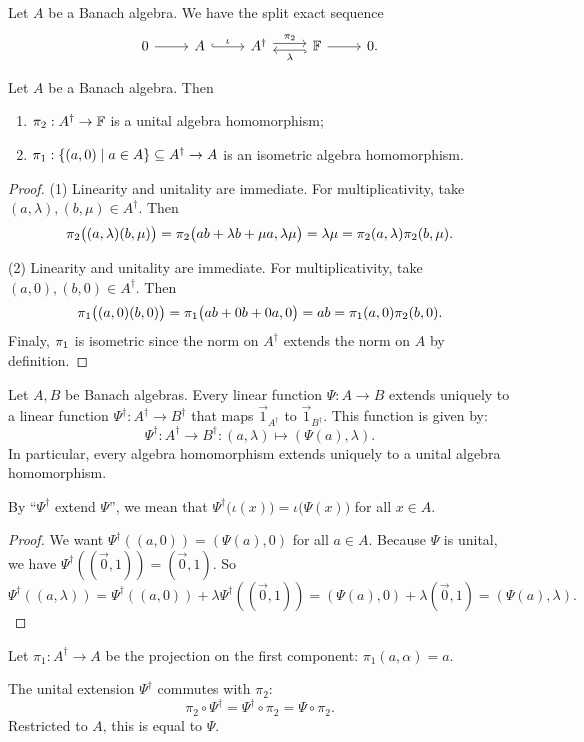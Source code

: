 \begin{lemma}
Let $A$ be a Banach algebra. We have the split exact sequence
\[ \begin{tikzcd}
0 \rar & A \rar[hook, "\iota"] & A^\dagger \rar[shift left, "\pi_2"] & \lar[hook, shift left, "\lambda"] \F \rar & 0.
\end{tikzcd} \]
\end{lemma}

\begin{lemma} \label{unitalProjectionsAlgebraHomomorphisms}
Let $A$ be a Banach algebra. Then
\begin{enumerate}
\item $\pi_2: A^\dagger \to \mathbb{F}$ is a unital algebra homomorphism;
\item $\proj_1: \setbuilder{(a,0)}{a\in A}\subseteq A^\dagger \to A$ is an isometric algebra homomorphism.
\end{enumerate}
\end{lemma}
\begin{proof}
(1) Linearity and unitality are immediate. For multiplicativity, take $(a,\lambda), (b, \mu)\in A^\dagger$. Then
\[ \pi_2\big((a,\lambda)(b, \mu)\big) = \pi_2\big(ab+\lambda b + \mu a, \lambda\mu\big) = \lambda\mu = \pi_2(a,\lambda)\pi_2(b,\mu). \]

(2) Linearity and unitality are immediate. For multiplicativity, take $(a,0), (b, 0)\in A^\dagger$. Then
\[ \pi_1\big((a,0)(b, 0)\big) = \pi_1\big(ab+0 b + 0 a, 0\big) = ab = \pi_1(a,0)\pi_2(b,0). \]
Finaly, $\pi_1$ is isometric since the norm on $A^\dagger$ extends the norm on $A$ by definition.
\end{proof}

\begin{lemma} \label{unitalExtensionLinearFunction}
Let $A,B$ be Banach algebras. Every linear function $\Psi:A\to B$ extends uniquely to a linear function $\Psi^\dagger: A^\dagger \to B^\dagger$ that maps $\vec{1}_{A^\dagger}$ to $\vec{1}_{B^\dagger}$. This function is given by:
\[ \Psi^\dagger: A^\dagger \to B^\dagger: (a,\lambda) \mapsto (\Psi(a),\lambda). \]
In particular, every algebra homomorphism extends uniquely to a unital algebra homomorphism.
\end{lemma}
By ``$\Psi^\dagger$ extend $\Psi$'', we mean that $\Psi^\dagger\big(\iota(x)\big) = \iota\big(\Psi(x)\big)$ for all $x\in A$.
\begin{proof}
We want $\Psi^\dagger((a,0)) = (\Psi(a),0)$ for all $a\in A$. Because $\Psi$ is unital, we have $\Psi^\dagger((\vec{0},1)) = (\vec{0},1)$. So
\[ \Psi^\dagger((a,\lambda)) = \Psi^\dagger((a,0))+\lambda \Psi^\dagger((\vec{0},1)) = (\Psi(a),0) + \lambda(\vec{0},1) = (\Psi(a),\lambda). \]
\end{proof}
\begin{corollary} \label{projectionOnACommutes}
Let $\pi_1: A^\dagger \to A$ be the projection on the first component: $\pi_1(a,\alpha) = a$.

The unital extension $\Psi^\dagger$ commutes with $\pi_2$:
\[ \pi_2\circ\Psi^\dagger = \Psi^\dagger \circ \pi_2 = \Psi\circ \pi_2. \]
Restricted to $A$, this is equal to $\Psi$.
\end{corollary}

